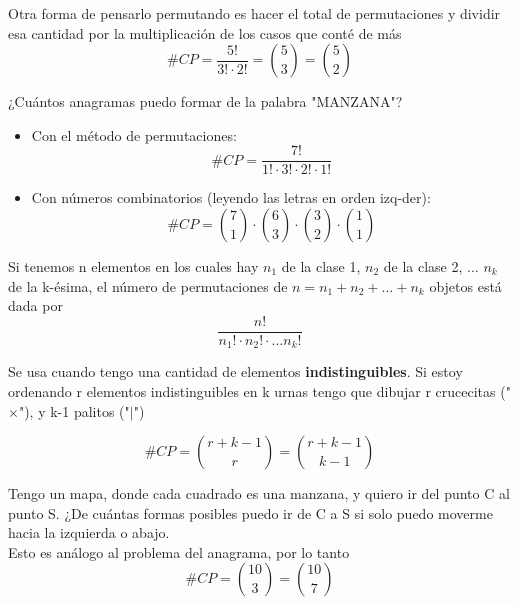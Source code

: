 \documentclass[../main.tex]{subfiles}
\begin{document}
\begin{note} Otra forma de pensarlo permutando es hacer el total de permutaciones y dividir esa cantidad por la multiplicación de los casos que conté de más
    \begin{equation*}
        \#CP = \frac{5!}{3!\cdot2!} = \binom{5}{3} = \binom{5}{2}
    \end{equation*}
\end{note}

\begin{defexample} ¿Cuántos anagramas puedo formar de la palabra "MANZANA"?
    \begin{itemize}
        \item Con el método de permutaciones:
            \begin{equation*}
                \#CP = \frac{7!}{1!\cdot3!\cdot2!\cdot1!}
            \end{equation*}
        \item Con números combinatorios (leyendo las letras en orden izq-der):
            \begin{equation*}
                \#CP = \binom{7}{1}\cdot\binom{6}{3}\cdot\binom{3}{2}\cdot\binom{1}{1}
            \end{equation*}
    \end{itemize}
\end{defexample}

\begin{definition}
    Si tenemos n elementos en los cuales hay $n_{1}$ de la clase 1, $n_{2}$ de la clase 2, ... $n_{k}$ de la k-ésima, el número de permutaciones de $n = n_{1} + n_{2} + \dots + n_{k}$ objetos está dada por
    \begin{equation*}
        \frac{n!}{n_{1}!\cdot n_{2}!\cdot\dots n_{k}!}
    \end{equation*}
\end{definition}

\begin{definition}
    Se usa cuando tengo una cantidad de elementos \textbf{indistinguibles}. Si estoy ordenando r elementos indistinguibles en k urnas tengo que dibujar r crucecitas ("$\times$"), y k-1 palitos ("$|$")
\end{definition}

\begin{definition}
    \begin{equation*}
        \#CP = \binom{r + k-1}{r} = \binom{r + k - 1}{k - 1}
    \end{equation*}
\end{definition}

\begin{defexample} Tengo un mapa, donde cada cuadrado es una manzana, y quiero ir del punto C al punto S. ¿De cuántas formas posibles puedo ir de C a S si solo puedo moverme hacia la izquierda o abajo.\\
Esto es análogo al problema del anagrama, por lo tanto
    \begin{equation*}
        \#CP = \binom{10}{3} = \binom{10}{7}
    \end{equation*}
\end{defexample}
\end{document}
